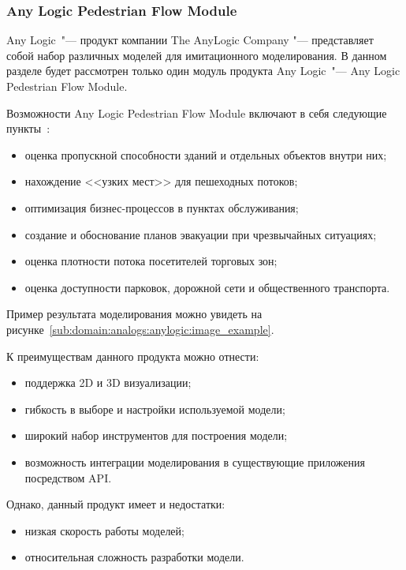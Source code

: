 \subsubsection{Any Logic Pedestrian Flow Module}
\label{sub:domain:analogs:anylogic}

Any Logic\textregistered\ "--- продукт компании The AnyLogic Company "--- представляет собой набор различных моделей для имитационного моделирования.
В данном разделе будет рассмотрен только один модуль продукта Any Logic\textregistered\ "--- Any Logic Pedestrian Flow Module.

Возможности Any Logic Pedestrian Flow Module включают в себя следующие пункты~\cite{anylogic}:
\begin{itemize}
  \item оценка пропускной способности зданий и отдельных объектов внутри них;
  \item нахождение <<узких мест>> для пешеходных потоков;
  \item оптимизация бизнес-процессов в пунктах обслуживания;
  \item создание и обоснование планов эвакуации при чрезвычайных ситуациях;
  \item оценка плотности потока посетителей торговых зон;
  \item оценка доступности парковок, дорожной сети и общественного транспорта.
\end{itemize}

Пример результата моделирования можно увидеть на рисунке~\ref{sub:domain:analogs:anylogic:image_example}.

К преимуществам данного продукта можно отнести:
\begin{itemize}
  \item поддержка 2D и 3D визуализации;
  \item гибкость в выборе и настройки используемой модели;
  \item широкий набор инструментов для построения модели;
  \item возможность интеграции моделирования в существующие приложения посредством API.
\end{itemize}

Однако, данный продукт имеет и недостатки:
\begin{itemize}
  \item низкая скорость работы моделей;
  \item относительная сложность разработки модели.
\end{itemize}

